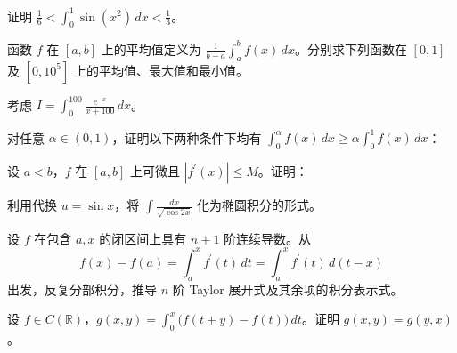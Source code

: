 \noindent\begin{minipage}{\textwidth}
证明 $\displaystyle\frac16<\int_0^1\sin(x^2)\,dx<\frac13$。
\end{minipage}\par\vfill
\noindent\begin{minipage}{\textwidth}
函数 $f$ 在 $[a,b]$ 上的平均值定义为 $\frac1{b-a}\int_a^b f(x)\,dx$。分别求下列函数在 $[0,1]$ 及 $[0,10^5]$ 上的平均值、最大值和最小值。
\end{minipage}\par\vfill
\noindent\begin{minipage}{\textwidth}
考虑 $I=\displaystyle\int_0^{100}\frac{e^{-x}}{x+100}\,dx$。
\end{minipage}\par\vfill
\newpage
\noindent\begin{minipage}{\textwidth}
对任意 $\alpha\in(0,1)$，证明以下两种条件下均有 $\int_0^\alpha f(x)\,dx\ge\alpha\int_0^1 f(x)\,dx$：
\end{minipage}\par\vfill
\noindent\begin{minipage}{\textwidth}
设 $a<b$，$f$ 在 $[a,b]$ 上可微且 $|f^{\prime}(x)|\le M$。证明：
\end{minipage}\par\vfill
\noindent\begin{minipage}{\textwidth}
利用代换 $u=\sin x$，将 $\displaystyle\int\frac{dx}{\sqrt{\cos2x}}$ 化为椭圆积分的形式。
\end{minipage}\par\vfill
\noindent\begin{minipage}{\textwidth}
设 $f$ 在包含 $a,x$ 的闭区间上具有 $n+1$ 阶连续导数。从\[f(x)-f(a)=\int_a^x f^{\prime}(t)\,dt=\int_a^x f^{\prime}(t)\,d(t-x)\]出发，反复分部积分，推导 $n$ 阶 Taylor 展开式及其余项的积分表示式。
\end{minipage}\par\vfill
\newpage
\noindent\begin{minipage}{\textwidth}
设 $f\in C(\mathbb R)$，$g(x,y)=\int_0^x\bigl(f(t+y)-f(t)\bigr)\,dt$。证明 $g(x,y)=g(y,x)$。
\end{minipage}\par\vfill
